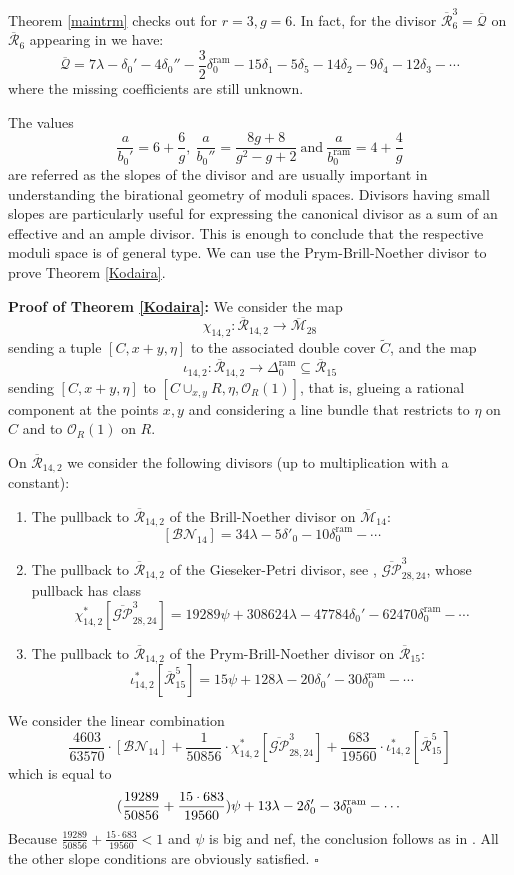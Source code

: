 \documentclass{article}
\theoremstyle{plain}
\theoremstyle{definition}
\def\OO{\mathcal{O}}
\def\rr{\overline{\mathcal{R}}}
\def\mm{\overline{\mathcal{M}}}
\begin{document}
Theorem \ref{maintrm} checks out for $r = 3, g= 6$. In fact, for the divisor $\rr^3_6 = \overline{\mathcal{Q}}$ on $\rr_{6}$ appearing in \cite{FarkasGrushevsky} we have: 
\[ \overline{\mathcal{Q}} = 7\lambda - \delta_0' -4\delta_0''-\frac{3}{2}\delta_0^{\textrm{ram}} - 15\delta_1 - 5\delta_5- 14\delta_2- 9\delta_4 -12 \delta_3 - \cdots \]
where the missing coefficients are still unknown. 

The values 
\[ \frac{a}{b_0'} = 6+ \frac{6}{g}, \ \frac{a}{b_0''} = \frac{8g+8}{g^2-g+2} \ \textrm{and} \ \frac{a}{b_0^{\textrm{ram}}} = 4 + \frac{4}{g} \]
are referred as the slopes of the divisor and are usually important in understanding the birational geometry of moduli spaces. Divisors having small slopes are particularly useful for expressing the canonical divisor as a sum of an effective and an ample divisor. This is enough to conclude that the respective moduli space is of general type. We can use the Prym-Brill-Noether divisor to prove Theorem \ref{Kodaira}. 

\textbf{Proof of Theorem \ref{Kodaira}:} We consider the map 
\[ \chi_{14,2}\colon \rr_{14,2}\rightarrow \mm_{28} \] 
sending a tuple $[C,x+y,\eta]$ to the associated double cover $\widetilde{C}$, and the map 
\[ \iota_{14,2}\colon \rr_{14,2}\rightarrow \Delta_0^{\mathrm{ram}}\subseteq \rr_{15}\]
sending $[C,x+y,\eta]$ to $[C\cup_{x,y}R, \eta, \OO_R(1)]$, that is, glueing a rational component at the points $x, y$ and considering a line bundle that restricts to $\eta$ on $C$ and to $\OO_R(1)$ on $R$. 

On $\rr_{14,2}$ we consider the following divisors (up to multiplication with a constant): 
\begin{enumerate}
	\item The pullback to $\rr_{14,2}$ of the Brill-Noether divisor on $\mm_{14}$: 
	\[ [\mathcal{BN}_{14}] = 34\lambda - 5\delta'_0 - 10\delta_0^{\mathrm{ram}}-\cdots \]
	\item The pullback to $\rr_{14,2}$ of the Gieseker-Petri divisor, see \cite[]{Farkosz}, $\overline{\mathcal{GP}}^3_{28,24}$, whose pullback has class 
	\[\chi^*_{14,2}[\overline{\mathcal{GP}}^3_{28,24}] = 19289\psi + 308624\lambda - 47784\delta_0' - 62470\delta_0^{\mathrm{ram}} - \cdots \]
	\item The pullback to $\rr_{14,2}$ of the Prym-Brill-Noether divisor on $\rr_{15}$: 
	\[ \iota_{14,2}^*[\rr^5_{15}] = 15\psi +128\lambda - 20\delta_0' - 30\delta_0^{\mathrm{ram}}-\cdots \]
\end{enumerate}
	We consider the linear combination 
\[ \frac{4603}{63570}\cdot [\mathcal{BN}_{14}] + \frac{1}{50856}\cdot \chi^*_{14,2}[\overline{\mathcal{GP}}^3_{28,24}] + \frac{683}{19560}\cdot  \iota_{14,2}^*[\rr^5_{15}] \]
which is equal to 
\[\text{\Large(}\frac{19289}{50856}+\frac{15\cdot683}{19560}\text{\Large)}\psi +13\lambda - 2\delta_0' - 3\delta_0^{\mathrm{ram}}-\cdots \]
Because $\frac{19289}{50856}+\frac{15\cdot683}{19560} < 1$ and $\psi$ is big and nef, the conclusion follows as in \cite{BudKodPrym}. All the other slope conditions are obviously satisfied. \hfill $\square$
\end{document}
